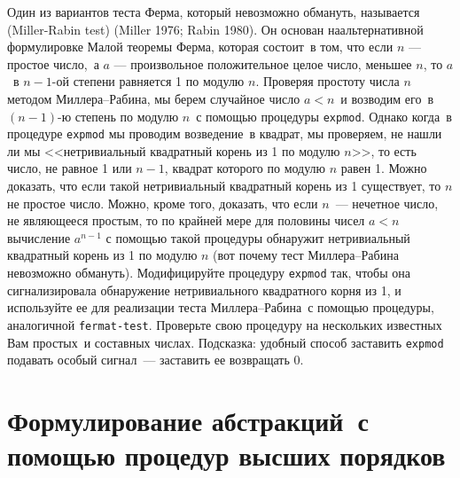 \begin{exercise}{1.28}\label{EX1.28}%
%
Один из вариантов теста Ферма, который невозможно 
обмануть, называется  (Miller-Rabin test) (Miller 1976;
Rabin 1980).
Он основан наальтернативной
формулировке Малой теоремы Ферма, которая состоит~в том, что если
$n$ --- простое число,~а $a$ --- произвольное
положительное целое число, меньшее $n$, то $a$~в 
$n - 1$-ой степени равняется 1 по модулю $n$.
Проверяя простоту числа $n$ методом Миллера--Рабина, мы
берем случайное число $a < n$~и возводим его~в $(n 
-1)$-ю степень по модулю $n$~с помощью процедуры
{\tt expmod}. Однако когда~в процедуре {\tt expmod} мы
проводим возведение~в квадрат, мы проверяем, не нашли ли мы
<<нетривиальный квадратный корень из 1 по модулю $n$>>, то
есть число, не равное 1 или $n - 1$, квадрат которого по
модулю $n$ равен 1.  Можно доказать, что если такой
нетривиальный квадратный корень из 1 существует, то $n$ не
простое число.  Можно, кроме того, доказать, что если
$n$~--- нечетное число, не являющееся простым, то по
крайней мере для 
половины чисел $a < n$ вычисление $a^{n-1}$
с помощью такой процедуры обнаружит нетривиальный квадратный корень из
1 по модулю $n$ (вот почему тест Миллера--Рабина невозможно
обмануть).  Модифицируйте процедуру {\tt expmod} так, чтобы она 
сигнализировала обнаружение нетривиального квадратного корня из 1, и
используйте ее для реализации теста Миллера--Рабина~с помощью
процедуры, аналогичной {\tt fermat-test}.  Проверьте свою
процедуру на нескольких известных Вам простых~и составных
числах.  Подсказка: удобный способ заставить {\tt expmod}
подавать особый сигнал~--- заставить ее возвращать 0.
\end{exercise}

\section{Формулирование абстракций~с помощью про\-це\-дур
высших порядков
\sloppy} %
\label{FORMULATING-ABSTRACTIONS-WITH-HIGHER-ORDER-PROCEDURES}

